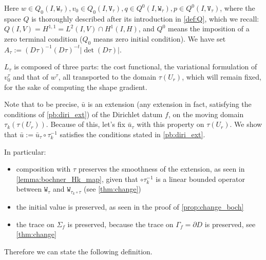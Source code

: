 \documentclass[english,a4paper,9pt,oneside]{scrbook}	%
\theoremstyle{break}
\theoremstyle{remark}
\newcommand{\tw}[1]{\texttt{#1}}
\begin{document}
Here $w \in Q_0(I, \tw{W}_\tau), v_0 \in Q_0(I,\tw{V}_\tau), q \in Q^0(I, \tw{W}_\tau), p \in Q^0(I, \tw{V}_\tau)$, where the space $Q$ is thoroughly described after its introduction in \cref{def:Q}, which we recall: $Q(I,V)=H^{1,1}=L^2(I,V)\cap H^1(I,H)$, and $Q^0$ means the imposition of a zero terminal condition ($Q_0$ means zero initial condition). We have set $A_\tau:=  (D\tau)^{-1}(D\tau)^{-t}|\det(D\tau)|$.

$L_\tau$ is composed of three parts: the cost functional, the variational formulation of $v_0^\tau$ and that of $w^\tau$, all transported to the domain $\tau(U_r)$, which will remain fixed, for the sake of computing the shape gradient.

Note that to be precise, $\bar{u}$ is an extension (any extension in fact, satisfying the conditions of \cref{pb:diri_ext}) of the Dirichlet datum $f$, on the moving domain $\tau_k(\tau(U_r))$. Because of this, let's fix $\bar{u}_\tau$ with this property on $\tau(U_r)$. We show that $\bar{u}:=\bar{u}_\tau\circ \tau_k^{-1}$ satisfies the conditions stated in \cref{pb:diri_ext}. 

In particular:

\begin{itemize}
	\item composition with $\tau$ preserves the smoothness of the extension, as seen in \cref{lemma:bochner_Hk_map}, given that $\circ \tau_k^{-1}$ is a linear bounded operator between $\tw{W}_\tau$ and $\tw{W}_{\tau_k \circ \tau}$ (see \cref{thm:change})
	\item the initial value is preserved, as seen in the proof of \cref{prop:change_boch}
	\item the trace on $\Sigma_f$ is preserved, because the trace on $\Gamma_f=\partial D$ is preserved, see \cref{thm:change}
\end{itemize}

Therefore we can state the following definition.
\end{document}
